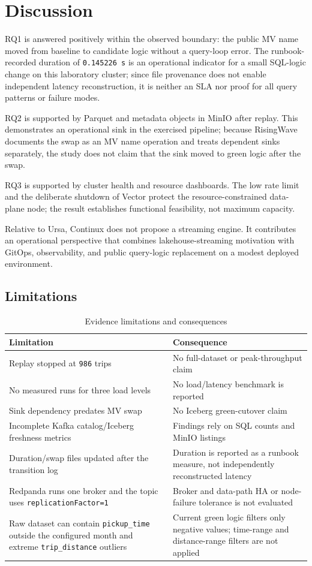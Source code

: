 \section{Discussion}\label{sec:discussion}
RQ1 is answered positively within the observed boundary: the public MV name moved from baseline to candidate logic without a query-loop error. The runbook-recorded duration of \texttt{0.145226 s} is an operational indicator for a small SQL-logic change on this laboratory cluster; since file provenance does not enable independent latency reconstruction, it is neither an SLA nor proof for all query patterns or failure modes.

RQ2 is supported by Parquet and metadata objects in MinIO after replay. This demonstrates an operational sink in the exercised pipeline; because RisingWave documents the swap as an MV name operation and treats dependent sinks separately, the study does not claim that the sink moved to green logic after the swap.

RQ3 is supported by cluster health and resource dashboards. The low rate limit and the deliberate shutdown of Vector protect the resource-constrained data-plane node; the result establishes functional feasibility, not maximum capacity.

Relative to Ursa, Continux does not propose a streaming engine. It contributes an operational perspective that combines lakehouse-streaming motivation with GitOps, observability, and public query-logic replacement on a modest deployed environment.

\subsection{Limitations}\label{sec:limitations}
\begin{table}[H]
\centering
\caption{Evidence limitations and consequences}
\begin{tabularx}{\textwidth}{@{}p{}Y@{}}
\toprule
\textbf{Limitation} & \textbf{Consequence}\\
\midrule
Replay stopped at \texttt{986} trips & No full-dataset or peak-throughput claim\\
No measured runs for three load levels & No load/latency benchmark is reported\\
Sink dependency predates MV swap & No Iceberg green-cutover claim\\
Incomplete Kafka catalog/Iceberg freshness metrics & Findings rely on SQL counts and MinIO listings\\
Duration/swap files updated after the transition log & Duration is reported as a runbook measure, not independently reconstructed latency\\
Redpanda runs one broker and the topic uses \texttt{replicationFactor=1} & Broker and data-path HA or node-failure tolerance is not evaluated\\
Raw dataset can contain \texttt{pickup\_time} outside the configured month and extreme \texttt{trip\_distance} outliers & Current green logic filters only negative values; time-range and distance-range filters are not applied\\
\bottomrule
\end{tabularx}
\end{table}

